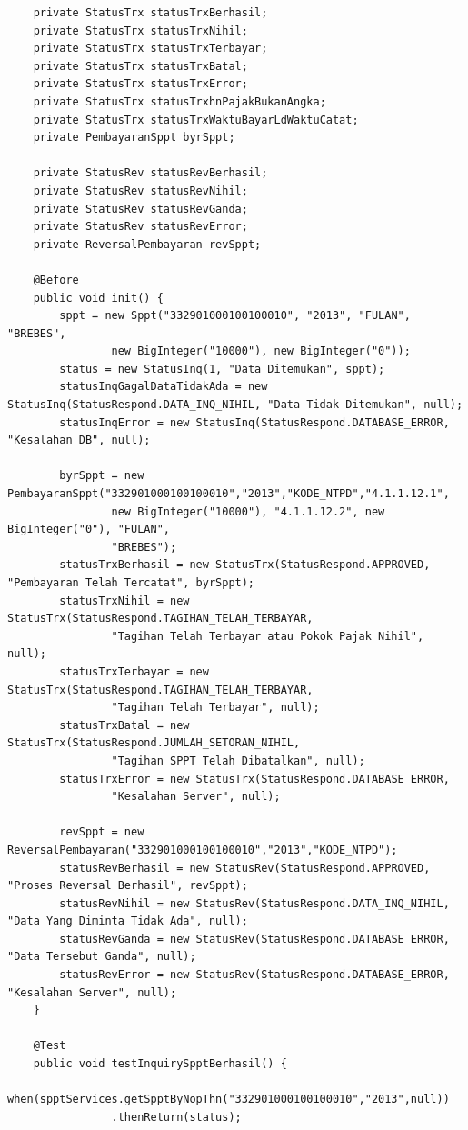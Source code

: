 \documentclass[pdftex,12pt, oneside]{article}
\begin{document}
\begin{enumerate}[A.]
\begin{enumerate}[1.]
\begin{lstlisting}
    private StatusTrx statusTrxBerhasil;
    private StatusTrx statusTrxNihil;
    private StatusTrx statusTrxTerbayar;
    private StatusTrx statusTrxBatal;
    private StatusTrx statusTrxError;
    private StatusTrx statusTrxhnPajakBukanAngka;
    private StatusTrx statusTrxWaktuBayarLdWaktuCatat;
    private PembayaranSppt byrSppt;

    private StatusRev statusRevBerhasil;
    private StatusRev statusRevNihil;
    private StatusRev statusRevGanda;
    private StatusRev statusRevError;
    private ReversalPembayaran revSppt;

    @Before
    public void init() {
        sppt = new Sppt("332901000100100010", "2013", "FULAN", "BREBES",
                new BigInteger("10000"), new BigInteger("0"));
        status = new StatusInq(1, "Data Ditemukan", sppt);
        statusInqGagalDataTidakAda = new StatusInq(StatusRespond.DATA_INQ_NIHIL, "Data Tidak Ditemukan", null);
        statusInqError = new StatusInq(StatusRespond.DATABASE_ERROR, "Kesalahan DB", null);

        byrSppt = new PembayaranSppt("332901000100100010","2013","KODE_NTPD","4.1.1.12.1",
                new BigInteger("10000"), "4.1.1.12.2", new BigInteger("0"), "FULAN",
                "BREBES");
        statusTrxBerhasil = new StatusTrx(StatusRespond.APPROVED, "Pembayaran Telah Tercatat", byrSppt);
        statusTrxNihil = new StatusTrx(StatusRespond.TAGIHAN_TELAH_TERBAYAR,
                "Tagihan Telah Terbayar atau Pokok Pajak Nihil", null);
        statusTrxTerbayar = new StatusTrx(StatusRespond.TAGIHAN_TELAH_TERBAYAR,
                "Tagihan Telah Terbayar", null);
        statusTrxBatal = new StatusTrx(StatusRespond.JUMLAH_SETORAN_NIHIL,
                "Tagihan SPPT Telah Dibatalkan", null);
        statusTrxError = new StatusTrx(StatusRespond.DATABASE_ERROR,
                "Kesalahan Server", null);

        revSppt = new ReversalPembayaran("332901000100100010","2013","KODE_NTPD");
        statusRevBerhasil = new StatusRev(StatusRespond.APPROVED, "Proses Reversal Berhasil", revSppt);
        statusRevNihil = new StatusRev(StatusRespond.DATA_INQ_NIHIL, "Data Yang Diminta Tidak Ada", null);
        statusRevGanda = new StatusRev(StatusRespond.DATABASE_ERROR, "Data Tersebut Ganda", null);
        statusRevError = new StatusRev(StatusRespond.DATABASE_ERROR, "Kesalahan Server", null);
    }

    @Test
    public void testInquirySpptBerhasil() {
        when(spptServices.getSpptByNopThn("332901000100100010","2013",null))
                .thenReturn(status);


\end{lstlisting}
\end{enumerate}
\end{enumerate}
\end{document}
